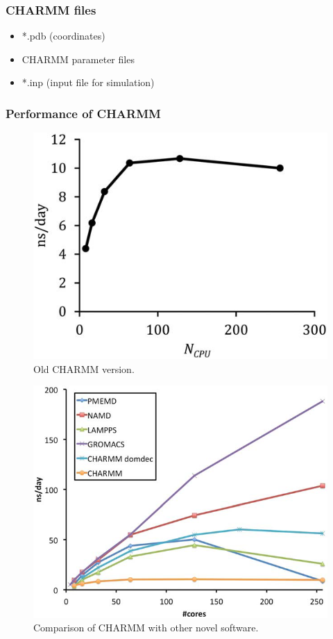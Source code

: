 \documentclass{beamer}
\begin{document}
\begin{frame}
\frametitle{CHARMM files}
\begin{itemize}
	\item *.pdb (coordinates)
	\item CHARMM parameter files 
	\item *.inp (input file for simulation)
\end{itemize}
\end{frame}

\begin{frame}
  \frametitle{Performance of CHARMM}

\begin{minipage}[t]{0.48\linewidth}

\begin{figure}
\includegraphics[scale=0.25]{pekka-charmm1.png}
\caption{{\scriptsize  Old CHARMM version.}}
\end{figure}

\end{minipage}
\hfill%
\begin{minipage}[t]{0.48\linewidth}
\begin{figure}
\includegraphics[scale=0.21]{pekka-charmm2.png}
\caption{{\scriptsize Comparison of CHARMM with other novel software.}}


\end{figure}
\end{minipage}
\end{frame}
\end{document}
